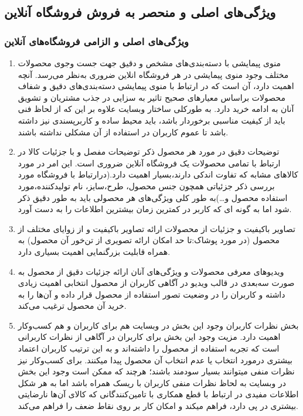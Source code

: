 \documentclass[14pt]{article}
\begin{document}
\begin{flushright}
\begin{itemize}
\subsection{ویژگی‌های اصلی و منحصر به فروش فروشگاه آنلاین}

\subsubsection{ویژگی‌های اصلی و الزامی فروشگاه‌های آنلاین}


\end{itemize}

\begin{enumerate}

\item منوی پیمایشی با دسته‌بندی‌های مشخص و دقیق جهت جست وجوی محصولات مختلف
\newline
وجود منوی پیمایشی در هر فروشگاه انلاین ضروری به‌نظر می‌رسد. آنچه اهمیت دارد، آن است که در ارتباط با منوی پیمایشی دسته‌بندی‌های دقیق و شفاف محصولات براساس معیارهای صحیح تاثیر به سزایی در جذب مشتریان و تشویق آنان به ادامه خرید دارد. به طورکلی ساختار وبسایت علاوه بر این که از لحاظ فنی باید از کیفیت مناسبی برخوردار باشد، باید محیط ساده و کاربرپسندی نیز داشته باشد تا عموم کاربران در استفاده از آن مشکلی نداشته باشند. 
\item توضیحات دقیق در مورد هر محصول
\newline
ذکر توضیحات مفصل و با جزئیات کالا در ارتباط با تمامی محصولات یک فروشگاه آنلاین ضروری است. این امر در مورد کالاهای مشابه که تفاوت اندکی دارند،‌بسیار اهمیت دارد.(درارتباط با فروشگاه مورد بررسی ذکر جزئیاتی همچون جنس محصول، طرح،سایز، نام تولیدکننده،مورد استفاده محصول و…)به طور کلی ویژگی‌های هر محصولی باید به طور دقیق ذکر شود اما به گونه ای که کاربر در کمترین زمان بیشترین اطلاعات را به دست آورد.
\item تصاویر باکیفیت و جزئیات از محصولات
\newline
ارائه تصاویر باکیفیت و از زوایای مختلف از محصول (در مورد پوشاک:تا حد امکان ارائه تصویری از تن‌خور آن محصول) به همراه قابلیت بزرگنمایی اهمیت بسیاری دارد.
\item ویدیوهای معرفی محصولات و ویژگی‌های آنان
\newline
ارائه جزئیات دقیق از محصول به صورت سه‌بعدی در قالب ویدیو در آگاهی کاربران از محصول انتخابی اهمیت زیادی داشته و کاربران را در وضعیت تصور استفاده از محصول قرار داده و آن‌ها را به خرید آن محصول ترغیب می‌کند.
\item بخش نظرات کاربران
\newline
وجود این بخش در وبسایت هم برای کاربران و هم کسب‌وکار اهمیت دارد. مزیت وجود این بخش برای کاربران در آگاهی از نظرات کاربرانی است که تجربه استفاده از محصول را داشته‌اند و به این ترتیب کاربران اعتماد بیشتری درمورد انتخاب یا عدم انتخاب آن محصول پیدا میکنند. برای کسب‌وکار نیز نظرات منفی میتوانند بسیار سودمند باشند؛‌ هرچند که ممکن است وجود این بخش در وبسایت به لحاظ نظرات منفی کاربران با ریسک همراه باشد اما به هر شکل اطلاعات مفیدی در ارتباط با قطع همکاری با تامین‌کنندگانی که کالای آن‌ها نارضایتی بیشتری در پی دارد، فراهم میکند و امکان کار بر روی نقاط ضعف را فراهم می‌کند.

\end{enumerate}
\end{flushright}
\end{document}
